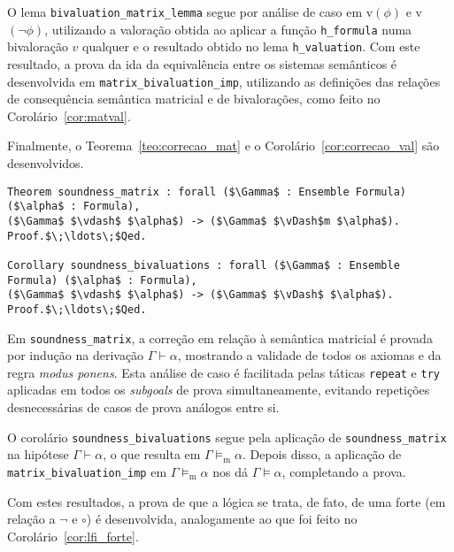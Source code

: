        O lema \texttt{bivaluation\_matrix\_lemma} segue por análise de caso em v$(\phi)$ e v$(\neg \phi)$, utilizando a valoração obtida ao aplicar a função \texttt{h\_formula} numa bivaloração $v$ qualquer e o resultado obtido no lema \texttt{h\_valuation}. Com este resultado, a prova da ida da equivalência entre os sistemas semânticos é desenvolvida em \texttt{matrix\_bivaluation\_imp}, utilizando as definições das relações de consequência semântica matricial e de bivalorações, como feito no Corolário~\ref{cor:matval}.

        Finalmente, o Teorema~\ref{teo:correcao_mat} e o Corolário~\ref{cor:correcao_val} são desenvolvidos.

        \begin{lstlisting}[name=Soundness, frame=single, language=coq]
Theorem soundness_matrix : forall ($\Gamma$ : Ensemble Formula) ($\alpha$ : Formula), 
($\Gamma$ $\vdash$ $\alpha$) -> ($\Gamma$ $\vDash$m $\alpha$).
Proof.$\;\ldots\;$Qed.

Corollary soundness_bivaluations : forall ($\Gamma$ : Ensemble Formula) ($\alpha$ : Formula), 
($\Gamma$ $\vdash$ $\alpha$) -> ($\Gamma$ $\vDash$ $\alpha$).
Proof.$\;\ldots\;$Qed.
        \end{lstlisting}

        Em \texttt{soundness\_matrix}, a correção em relação à semântica matricial é provada por indução na derivação $\Gamma \vdash \alpha$, mostrando a validade de todos os axiomas e da regra \textit{modus ponens}. Esta análise de caso é facilitada pelas táticas \texttt{repeat} e \texttt{try} aplicadas em todos os \textit{subgoals} de prova simultaneamente, evitando repetições desnecessárias de casos de prova análogos entre si.

        O corolário \texttt{soundness\_bivaluations} segue pela aplicação de \texttt{soundness\_matrix} na hipótese $\Gamma \vdash \alpha$, o que resulta em $\Gamma \vDash_\text{m}\alpha$. Depois disso, a aplicação de \texttt{matrix\_bivaluation\_imp} em $\Gamma \vDash_\text{m}\alpha$ nos dá $\Gamma \vDash \alpha$, completando a prova.

        Com estes resultados, a prova de que a lógica \lfium{} se trata, de fato, de uma \lfi{} forte (em relação a $\neg$ e $\circ$) é desenvolvida, analogamente ao que foi feito no Corolário~\ref{cor:lfi_forte}.

